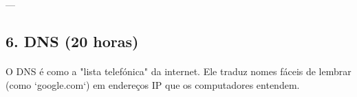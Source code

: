\documentclass[10pt,a4paper]{article}
\newcommand{\guia}[1]{\textcolor{darkblue}{#1}} %
\begin{document}
	---
	
	\guia{
	}
	\subsection*{6. DNS (20 horas)}
	\vspace{-1.2em}
	\paragraph{}
	O DNS é como a "lista telefónica" da internet. Ele traduz nomes fáceis de lembrar (como `google.com`) em endereços IP que os computadores entendem.
	
\end{document}
